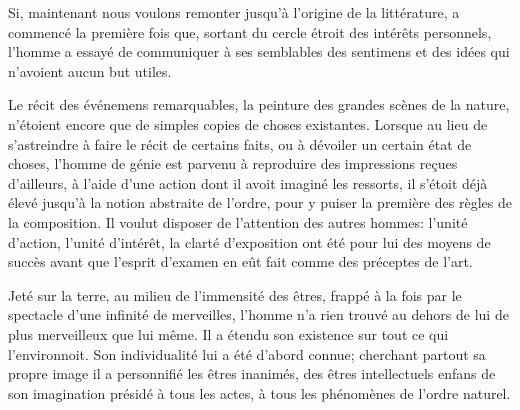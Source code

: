 \documentclass[11pt,a4paper]{article}
\begin{document}
Si,  maintenant nous voulons remonter jusqu'à l'origine de
la littérature,  a commencé la première
fois que, sortant du cercle étroit des intérêts personnels, l'homme a
essayé de communiquer à ses semblables des  sentimens et des idées qui n'avoient aucun but
 utiles.

Le récit des événemens remarquables, la peinture des grandes scènes de
la nature, n'étoient encore que de simples copies de choses
existantes. Lorsque  au lieu de s'astreindre à
 faire le récit  de certains faits, ou
à dévoiler un certain état  de choses, l'homme de
génie  est parvenu à reproduire des impressions reçues
d'ailleurs, à l'aide d'une action dont il avoit imaginé les
\struck{\ill{}} ressorts,  il s'étoit déjà
\struck{\ill{}} élevé jusqu'à la notion abstraite de l'ordre, pour y
puiser la première des règles de la composition. Il voulut disposer de
\struck{\ill{}} l'attention des autres hommes: 
l'unité d'action, l'unité d'intérêt,  \struck{\ill{}}
la clarté d'exposition ont été pour lui des moyens de succès
 avant que l'esprit d'examen en eût fait  comme des préceptes de l'art.

Jeté sur la terre, au milieu de l'immensité des êtres, frappé à la fois
par le spectacle d'une  infinité de merveilles,
l'homme n'a rien trouvé au dehors de lui de plus merveilleux que lui
même. Il a étendu son existence sur tout ce qui l'environnoit. Son
\struck{\ill{}} individualité lui a été d'abord connue; cherchant
partout sa propre image il a personnifié les êtres inanimés, des êtres
intellectuels enfans de son imagination  
présidé à tous les actes, à tous les phénomènes de  l'ordre naturel.
\end{document}
